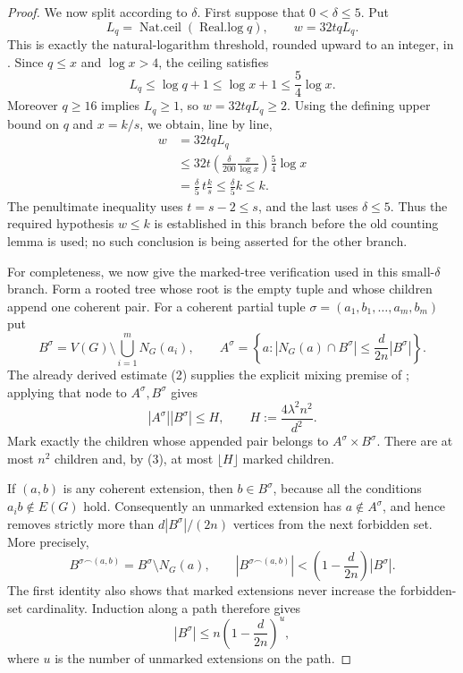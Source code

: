 \begin{proof}
We now split according to $\delta$.  First suppose that
$0<\delta\leq5$.  Put
\[
 L_q=\operatorname{Nat.ceil}(\operatorname{Real.log}q),
 \qquad w=32tqL_q.
\]
This is exactly the natural-logarithm threshold, rounded upward to an
integer, in .  Since $q\leq x$ and $\log x>4$,
the ceiling satisfies
\[
 L_q\leq\log q+1\leq\log x+1\leq\frac54\log x.
\]
Moreover $q\geq16$ implies $L_q\geq1$, so $w=32tqL_q\geq2$.
Using the defining upper bound on $q$ and $x=k/s$, we obtain, line by line,
\[
\begin{aligned}
 w&=32tqL_q\\
  &\leq32t\left(\frac{\delta}{200}\frac{x}{\log x}\right)
       \frac54\log x\\
  &=\frac{\delta}{5}\,t\frac{k}{s}
   \leq\frac{\delta}{5}k
   \leq k.
\end{aligned} \tag{6}
\]
The penultimate inequality uses $t=s-2\leq s$, and the last uses
$\delta\leq5$.  Thus the required hypothesis $w\leq k$ is established in
this branch before the old counting lemma is used; no such conclusion is
being asserted for the other branch.

For completeness, we now give the marked-tree verification used in this
small-$\delta$ branch.  Form a rooted tree whose root is the empty tuple and
whose children append one coherent pair.  For a coherent partial tuple
$\sigma=(a_1,b_1,\ldots,a_m,b_m)$ put
\[
 B^\sigma=V(G)\setminus\bigcup_{i=1}^mN_G(a_i),\qquad
 A^\sigma=\left\{a:|N_G(a)\cap B^\sigma|
       \leq\frac{d}{2n}|B^\sigma|\right\}.
\]
The already derived estimate (2) supplies the explicit mixing premise of
; applying that node to $A^\sigma,B^\sigma$ gives
\[
 |A^\sigma||B^\sigma|\leq H,\qquad
 H:=\frac{4\lambda^2n^2}{d^2}. \tag{3}
\]
Mark exactly the children whose appended pair belongs to
$A^\sigma\times B^\sigma$.  There are at most $n^2$ children and, by (3),
at most $\lfloor H\rfloor$ marked children.

If $(a,b)$ is any coherent extension, then $b\in B^\sigma$, because all
the conditions $a_i b\notin E(G)$ hold.  Consequently an unmarked
extension has $a\notin A^\sigma$, and hence removes strictly more than
$d|B^\sigma|/(2n)$ vertices from the next forbidden set.  More precisely,
\[
 B^{\sigma\mathbin{\smallfrown}(a,b)}=B^\sigma\setminus N_G(a),
 \qquad
 |B^{\sigma\mathbin{\smallfrown}(a,b)}|
 <\left(1-\frac d{2n}\right)|B^\sigma|. \tag{4}
\]
The first identity also shows that marked extensions never increase the
forbidden-set cardinality.  Induction along a path therefore gives
\[
 |B^\sigma|\leq n\left(1-\frac d{2n}\right)^u, \tag{5}
\]
where $u$ is the number of unmarked extensions on the path.


\end{proof}
